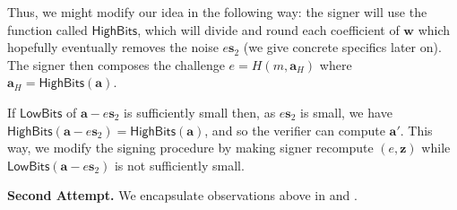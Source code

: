 \documentclass{template}
\begin{document}
Thus, we might modify our idea in the following way: the signer will use the
function called $\mathsf{HighBits}$, which will divide and round each
coefficient of $\mathbf{w}$ which hopefully eventually removes the noise
$e\mathbf{s}_2$ (we give concrete specifics later on). The signer then composes
the challenge $e = H(m,\mathbf{a}_H)$ where $\mathbf{a}_H =
\mathsf{HighBits}(\mathbf{a})$.

If $\mathsf{LowBits}$ of $\mathbf{a}-e\mathbf{s}_2$ is sufficiently small then,
as $e\mathbf{s}_2$ is small, we have
$\mathsf{HighBits}(\mathbf{a}-e\mathbf{s}_2)=\mathsf{HighBits}(\mathbf{a})$, and
so the verifier can compute $\mathbf{a}'$. This way, we modify the signing
procedure by making signer recompute $(e,\mathbf{z})$ while
$\mathsf{LowBits}(\mathbf{a}-e\mathbf{s}_2)$ is not sufficiently small.

\textbf{Second Attempt.} We encapsulate observations above in
 and .
\end{document}
